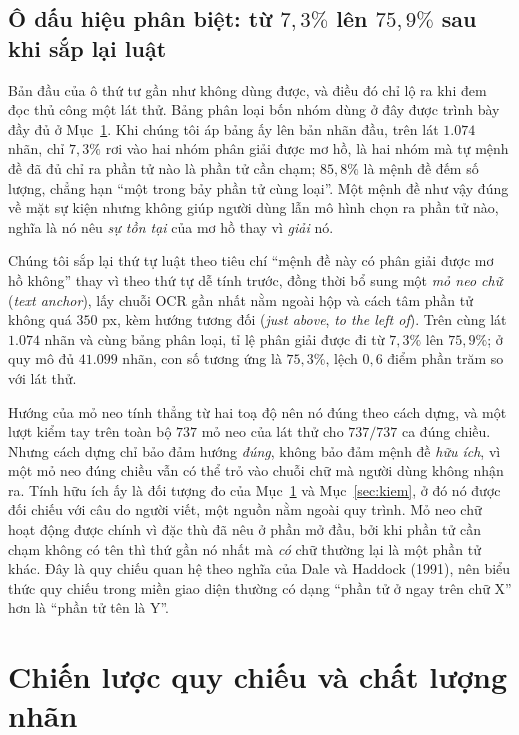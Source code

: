 \documentclass[12pt,a4paper,onecolumn]{article}
\newcommand{\ôvuông}[2]{\tikz[baseline=-0.45ex]{\draw[#1,line width=0.9pt,#2] (0,0) rectangle (0.34,0.18);}}
\begin{document}
\subsection{Ô dấu hiệu phân biệt: từ $7{,}3\%$ lên $75{,}9\%$ sau khi sắp lại luật}
\label{sec:lamlai}

Bản đầu của ô thứ tư gần như không dùng được, và điều đó chỉ lộ ra khi đem đọc thủ công một lát
thử. Bảng phân loại bốn nhóm dùng ở đây được trình bày đầy đủ ở Mục~\ref{sec:phanbo}. Khi
chúng tôi áp bảng ấy lên bản nhãn đầu, trên lát $1.074$ nhãn, chỉ $7{,}3\%$ rơi vào hai nhóm phân giải được mơ hồ, là hai nhóm mà tự mệnh đề đã đủ chỉ ra phần tử nào là phần tử
cần chạm; $85{,}8\%$ là mệnh đề đếm số
lượng, chẳng hạn ``một trong bảy phần tử cùng loại''. Một mệnh đề như vậy đúng về mặt sự
kiện nhưng không giúp người dùng lẫn mô hình chọn ra phần tử nào, nghĩa là nó nêu \emph{sự tồn tại} của mơ hồ thay vì \emph{giải} nó.

Chúng tôi sắp lại thứ tự luật theo tiêu chí ``mệnh đề này có phân giải được mơ hồ không''
thay vì theo thứ tự dễ tính trước, đồng thời bổ sung một \emph{mỏ neo chữ} (\emph{text
anchor}), lấy chuỗi OCR gần nhất nằm ngoài hộp và cách tâm phần tử không quá $350$ px, kèm
hướng tương đối (\emph{just above}, \emph{to the left of}). Trên cùng lát $1.074$ nhãn và
cùng bảng phân loại, tỉ lệ phân giải được đi từ $7{,}3\%$ lên $75{,}9\%$; ở quy mô đủ
$41.099$ nhãn, con số tương ứng là $75{,}3\%$, lệch $0{,}6$ điểm phần trăm so với lát thử.

Hướng của mỏ neo tính thẳng từ hai toạ độ nên nó đúng theo cách dựng, và một lượt kiểm tay
trên toàn bộ $737$ mỏ neo của lát thử cho $737/737$ ca đúng chiều. Nhưng cách dựng chỉ bảo
đảm hướng \emph{đúng}, không bảo đảm mệnh đề \emph{hữu ích}, vì một mỏ neo đúng chiều vẫn có thể trỏ vào chuỗi
chữ mà người dùng không nhận ra. Tính hữu ích ấy là đối tượng đo của Mục~\ref{sec:phanbo} và
Mục~\ref{sec:kiem}, ở đó nó được đối chiếu với câu do người viết, một nguồn nằm ngoài quy trình. Mỏ neo chữ hoạt động được chính vì đặc thù đã nêu ở phần mở đầu, bởi khi phần tử cần chạm
không có tên thì thứ gần nó nhất mà \emph{có} chữ thường lại là một phần tử khác. Đây là quy chiếu quan hệ theo nghĩa của Dale và Haddock (1991), nên
biểu thức quy chiếu trong miền giao diện thường có dạng ``phần tử ở ngay trên chữ X'' hơn
là ``phần tử tên là Y''.

\section{Chiến lược quy chiếu và chất lượng nhãn}
\label{sec:phanbo}
\end{document}
